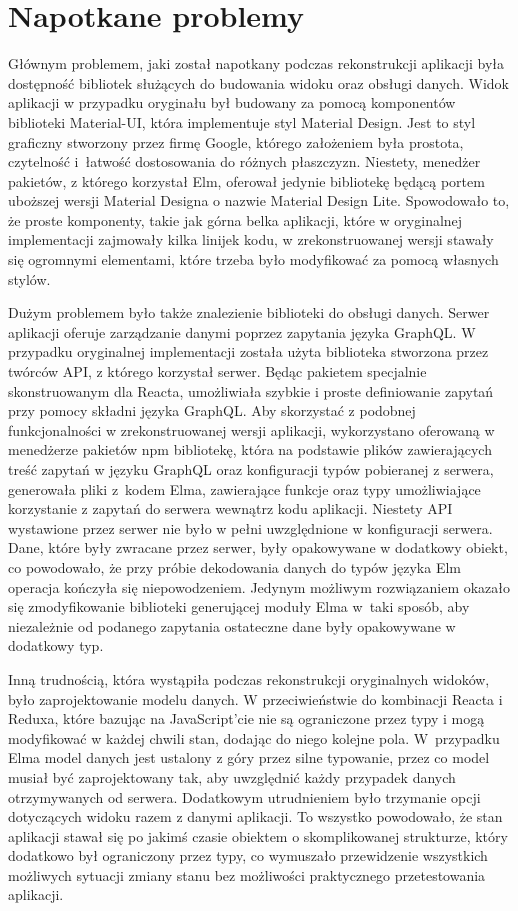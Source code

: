 \section{Napotkane problemy}
Głównym problemem, jaki został napotkany podczas rekonstrukcji aplikacji była dostępność bibliotek służących do budowania widoku oraz obsługi danych. Widok aplikacji w przypadku oryginału był budowany za pomocą komponentów biblioteki Material-UI, która implementuje styl Material Design. Jest to styl graficzny stworzony przez firmę Google, którego założeniem była prostota, czytelność i~łatwość dostosowania do różnych płaszczyzn. Niestety, menedżer pakietów, z którego korzystał Elm, oferował jedynie bibliotekę będącą portem uboższej wersji Material Designa o nazwie Material Design Lite. Spowodowało to, że proste komponenty, takie jak górna belka aplikacji, które w oryginalnej implementacji zajmowały kilka linijek kodu, w zrekonstruowanej wersji stawały się ogromnymi elementami, które trzeba było modyfikować za pomocą własnych stylów.

Dużym problemem było także znalezienie biblioteki do obsługi danych. Serwer aplikacji oferuje zarządzanie danymi poprzez zapytania języka GraphQL. W przypadku oryginalnej implementacji została użyta biblioteka stworzona przez twórców API, z którego korzystał serwer. Będąc pakietem specjalnie skonstruowanym dla Reacta, umożliwiała szybkie i proste definiowanie zapytań przy pomocy składni języka GraphQL. Aby skorzystać z podobnej funkcjonalności w zrekonstruowanej wersji aplikacji, wykorzystano oferowaną w menedżerze pakietów npm bibliotekę, która na podstawie plików zawierających treść zapytań w języku GraphQL oraz konfiguracji typów pobieranej z serwera, generowała pliki z~kodem Elma, zawierające funkcje oraz typy umożliwiające korzystanie z zapytań do serwera wewnątrz kodu aplikacji. Niestety API wystawione przez serwer nie było w pełni uwzględnione w konfiguracji serwera. Dane, które były zwracane przez serwer, były opakowywane w dodatkowy obiekt, co powodowało, że przy próbie dekodowania danych do typów języka Elm operacja kończyła się niepowodzeniem. Jedynym możliwym rozwiązaniem okazało się zmodyfikowanie biblioteki generującej moduły Elma w~taki sposób, aby niezależnie od podanego zapytania ostateczne dane były opakowywane w dodatkowy typ.

Inną trudnością, która wystąpiła podczas rekonstrukcji oryginalnych widoków, było zaprojektowanie modelu danych. W przeciwieństwie do kombinacji Reacta i Reduxa, które bazując na JavaScript'cie nie są ograniczone przez typy i mogą modyfikować w każdej chwili stan, dodając do niego kolejne pola. W~przypadku Elma model danych jest ustalony z góry przez silne typowanie, przez co model musiał być zaprojektowany tak, aby uwzględnić każdy przypadek danych otrzymywanych od serwera. Dodatkowym utrudnieniem było trzymanie opcji dotyczących widoku razem z danymi aplikacji. To wszystko powodowało, że stan aplikacji stawał się po jakimś czasie obiektem o skomplikowanej strukturze, który dodatkowo był ograniczony przez typy, co wymuszało przewidzenie wszystkich możliwych sytuacji zmiany stanu bez możliwości praktycznego przetestowania aplikacji.